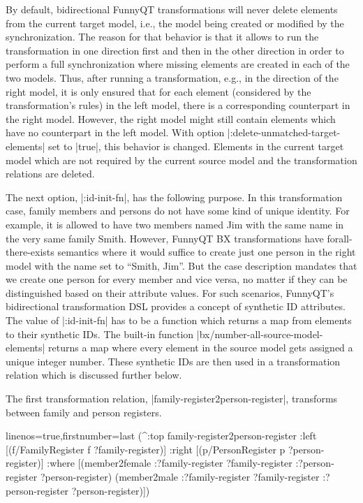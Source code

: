 \documentclass[a4paper]{article}
\newcommand{\code}{\clojureinline}
\begin{document}
By default, bidirectional FunnyQT transformations will never delete elements
from the current target model, i.e., the model being created or modified by the
synchronization.  The reason for that behavior is that it allows to run the
transformation in one direction first and then in the other direction in order
to perform a full synchronization where missing elements are created in each of
the two models.  Thus, after running a transformation, e.g., in the direction
of the right model, it is only ensured that for each element (considered by the
transformation's rules) in the left model, there is a corresponding counterpart
in the right model.  However, the right model might still contain elements
which have no counterpart in the left model.  With option
\code|:delete-unmatched-target-elements| set to \code|true|, this behavior is
changed.  Elements in the current target model which are not required by the
current source model and the transformation relations are deleted.

The next option, \code|:id-init-fn|, has the following purpose.  In this
transformation case, family members and persons do not have some kind of unique
identity.  For example, it is allowed to have two members named Jim with the
same name in the very same family Smith.  However, FunnyQT BX transformations
have forall-there-exists semantics where it would suffice to create just one
person in the right model with the name set to ``Smith, Jim''.  But the case
description mandates that we create one person for every member and vice versa,
no matter if they can be distinguished based on their attribute values.  For
such scenarios, FunnyQT's bidirectional transformation DSL provides a concept
of synthetic ID attributes.  The value of \code|:id-init-fn| has to be a
function which returns a map from elements to their synthetic IDs.  The
built-in function \code|bx/number-all-source-model-elements| returns a map
where every element in the source model gets assigned a unique integer number.
These synthetic IDs are then used in a transformation relation which is
discussed further below.

The first transformation relation, \code|family-register2person-register|,
transforms between family and person registers.

\begin{clojurecode*}{linenos=true,firstnumber=last}
  (^:top family-register2person-register
   :left  [(f/FamilyRegister f ?family-register)]
   :right [(p/PersonRegister p ?person-register)]
   :where [(member2female :?family-register ?family-register :?person-register ?person-register)
           (member2male :?family-register ?family-register :?person-register ?person-register)])
\end{clojurecode*}
\end{document}
